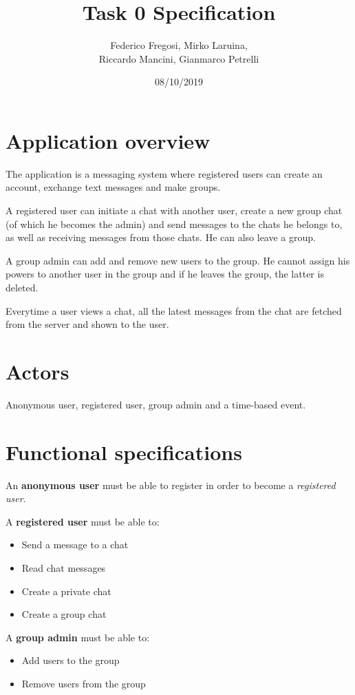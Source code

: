 \documentclass[titlepage, 12pt]{article}
\title{Task 0 Specification}
\date{08/10/2019}
\author{Federico Fregosi, Mirko Laruina, \\Riccardo Mancini, Gianmarco Petrelli}
\begin{document}
\maketitle

\section{Application overview}
The application is a messaging system where registered users can create an 
account, exchange text messages and make groups.

A registered user can initiate a chat with another user, create a new group chat
(of which he becomes the admin) and send messages to the chats he belongs to,
as well as receiving messages from those chats. He can also leave a group.

A group admin can add and remove new users to the group. He cannot assign his
powers to another user in the group and if he leaves the group, the latter 
is deleted.

Everytime a user views a chat, all the latest messages from the chat are fetched from 
the server and shown to the user.

\section{Actors}
Anonymous user, registered user, group admin and a time-based event.

\section{Functional specifications}
An \textbf{anonymous user} must be able to register in order to become a 
\emph{registered user}.

A \textbf{registered user} must be able to:
\begin{itemize}
    \item Send a message to a chat
    \item Read chat messages
    \item Create a private chat
    \item Create a group chat
\end{itemize}

A \textbf{group admin} must be able to:
\begin{itemize}
    \item Add users to the group
    \item Remove users from the group
\end{itemize}
\end{document}
